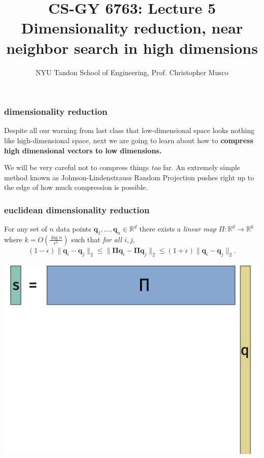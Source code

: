\documentclass[compress]{beamer}
\title{CS-GY 6763: Lecture 5 \\ Dimensionality reduction, near neighbor search in high dimensions}
\author{NYU Tandon School of Engineering, Prof. Christopher Musco}
\date{}
\newcommand{\bs}[1]{\boldsymbol{#1}}
\newcommand{\bv}[1]{\mathbf{#1}}
\newcommand{\R}{\mathbb{R}}
\begin{document}
\begin{frame}
	\titlepage 
\end{frame}



\begin{frame}
	\frametitle{dimensionality reduction}
	Despite all our warning from last class that low-dimensional space looks nothing like high-dimensional space, next we are going to learn about how to \textbf{compress high dimensional vectors to low dimensions.} 
	
	We will be very careful not to compress things \emph{too} far. An extremely simple method known as Johnson-Lindenstrauss Random Projection pushes right up to the edge of how much compression is possible. 
\end{frame}


\begin{frame}
	\frametitle{euclidean dimensionality reduction}
	\begin{lemma}
		For any set of $n$ data points $\bv{q}_1,\ldots, \bv{q}_n \in \R^d$ there exists a \emph{linear map} $\Pi: \R^d \rightarrow \R^k$ where $k = O\left(\frac{\log n}{\epsilon^2}\right)$ such that \emph{for all $i,j$},
		\begin{align*}
			(1-\epsilon)\|\bv{q}_i - \bv{q}_j\|_2 \leq \|\bs{\Pi}\bv{q}_i - \bs{\Pi}\bv{q}_j\|_2 \leq (1+\epsilon)\|\bv{q}_i - \bv{q}_j\|_2.
		\end{align*}
	\end{lemma}
	\begin{center}
		\includegraphics[height=.45\textheight]{jl_sketch.png}
	\end{center}
\end{frame}
\end{document}
